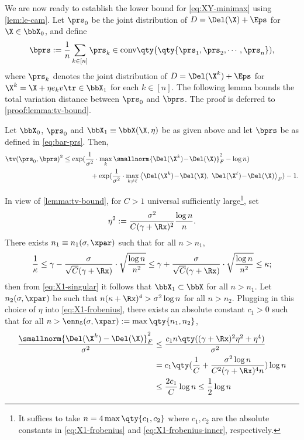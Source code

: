 \documentclass[10pt]{article}
\begin{document}
We are now ready to establish the lower bound for \cref{eq:XY-minimax} using \cref{lem:le-cam}. Let $\prs_0$ be the joint distribution of $D = \Del(\X) + \Eps$ for $\X \in \bbX_0$, and define 
\begin{align}
    \bprs := \frac{1}{n}\sum_{k \in [n]}\prs_k \in \text{conv}\qty\big(\qty{\prs_1, \prs_2, \cdots, \prs_n}),\label{eq:bar-prs}
\end{align}
where $\prs_k$ denotes the joint distribution of $D = \Del(\X^k) + \Eps$ for $\X^k = \X + \eta e_kv\tr \in \bbX_1$ for each $k \in [n]$. The following lemma bounds the total variation distance between $\prs_0$ and $\bprs$. The proof is deferred to \cref{proof:lemma:tv-bound}.
\begin{lemma}\label{lemma:tv-bound}
    Let $\bbX_0$, $\prs_0$ and $\bbX_1 \equiv \bbX(\X, \eta)$ be as given above and let $\bprs$ be as defined in \cref{eq:bar-prs}. Then,
    \begin{align}
        \tv(\prs_0, \bprs)^2
        &\le \exp(\frac{1}{\sigma^2} \cdot {\max_{k}\smallnorm{\Del(\X^k)\!-\!\Del(\X)}^2_F} - \log{n})\\
        &\qquad\qquad + \exp(\frac{1}{\sigma^2} \cdot {\max_{k \neq \ell}{\big\langle{\Del(\X^k)\!-\!\Del(\X),\; \Del(\X^\ell)\!-\!\Del(\X)}\big\rangle_F}}) - 1.\label{eq:tv-bound}
    \end{align}
\end{lemma}
In view of \cref{lemma:tv-bound}, for $C > 1$ universal sufficiently large\footnote{It suffices to take $n = 4\max\qty{c_1, c_2}$ where $c_1, c_2$ are the absolute constants in \ref{eq:X1-frobenius} and \ref{eq:X1-frobenius-inner}, respectively.}, set
\begin{align}
    \eta^2 := \frac{\sigma^2}{C(\gamma+\Rx)^2}\frac{\log{n}}{n}.
\end{align}
There exists $n_1 \equiv n_1(\sigma, \xpar)$ such that for all $n> n_1$,
$$
\frac{1}{\kappa} \le \gamma - \frac{\sigma}{\sqrt{C}(\gamma + \Rx)}\cdot\sqrt{\frac{\log{n}}{n^2}} \le \gamma + \frac{\sigma}{\sqrt{C}(\gamma + \Rx)}\cdot\sqrt{\frac{\log{n}}{n^2}} \le \kappa;
$$
then from \ref{eq:X1-singular} it follows that $\bbX_1 \subset \bbX$ for all $n > n_1$. Let $n_2(\sigma, \xpar)$ be such that $n(\kappa+\Rx)^4 > \sigma^2\log{n}$ for all $n > n_2$. Plugging in this choice of $\eta$ into \ref{eq:X1-frobenius}, there exists an absolute constant $c_1 > 0$ such that for all $n > \enn_5(\sigma, \xpar) := \max\qty{n_1, n_2}$,
\begin{align}
    \frac{\smallnorm{\Del(\X^k) - \Del(\X)}^2_F}{\sigma^2} &\le \frac{c_1n\qty((\gamma+\Rx)^2\eta^2 + \eta^4)}{\sigma^2}\\ 
    &= c_1\qty(\frac{1}{C} + \frac{\sigma^2\log{n}}{C^2(\gamma+\Rx)^4n}) \log{n} \\
    &\le \frac{2c_1}{C}\log{n} \le \frac{1}{2}\log{n}\label{eq:tv-bound-1}
\end{align}
\end{document}
